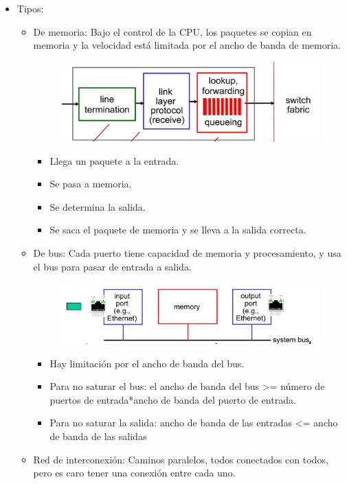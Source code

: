 \documentclass[12pt, twoside, openright]{report} %
\begin{document}
    \begin{itemize}
    \item
      Tipos:

      \begin{itemize}
      \item
        De memoria: Bajo el control de la CPU, los paquetes se copian en
        memoria y la velocidad está limitada por el ancho de banda de
        memoria.
		\begin{figure}[H]
			{\includegraphics[scale=.15]{Untitled 23.png}}
		\end{figure}

        \begin{itemize}
        \item
          Llega un paquete a la entrada.
        \item
          Se pasa a memoria.
        \item
          Se determina la salida.
        \item
          Se saca el paquete de memoria y se lleva a la salida correcta.
        \end{itemize}
      \item
        De bus: Cada puerto tiene capacidad de memoria y procesamiento,
        y usa el bus para pasar de entrada a salida.
		\begin{figure}[H]
			{\includegraphics[scale=.15]{Untitled 24.png}}
		\end{figure}
        \begin{itemize}
        \item
          Hay limitación por el ancho de banda del bus.
        \item
          Para no saturar el bus: el ancho de banda del bus
          \textgreater= número de puertos de entrada*ancho de banda del
          puerto de entrada.
        \item
          Para no saturar la salida: ancho de banda de las entradas
          \textless= ancho de banda de las salidas
        \end{itemize}
      \item
        Red de interconexión: Caminos paralelos, todos conectados con
        todos, pero es caro tener una conexión entre cada uno.


\end{itemize}
\end{itemize}
\end{document}
